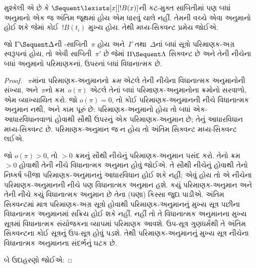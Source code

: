 મુશ્કેલી એ છે કે
$\Sequent \lexists[x][!B(x)]$ની
કટ-મુક્ત સાબિતીમાં પણ
બધાં~\RightR{\lexists}
અનુમાનો એક જ અંતિમ જૂથમાં
હોય એમ ધારવું ચાલે નહીં.
તેમની વચ્ચે એવા અનુમાનો
હોઈ શકે જેમાં કોઈ~$!B(t_i)$
મુખ્ય હોય. તેથી મધ્ય-સિક્વન્ટ
પ્રમેય જોઈએ.

\begin{thm}[મધ્ય-સિક્વન્ટ પ્રમેય]
જો $\Gamma \Sequent \Delta$ની
-સાબિતી~$\pi$ હોય
અને~$\Gamma$ તથા~$\Delta$નાં
બધાં સૂત્રો પરિમાણક-અગ્ર
સ્વરૂપનાં હોય, તો એવી
સાબિતી~$\pi'$ છે જેમાં
$\Pi \Sequent \Lambda$
સિક્વન્ટ છે અને તેની નીચેના
બધાં અનુમાનો પરિમાણકનાં,
ઉપરનાં બધાં વિધાનાત્મક છે.
\end{thm}

\begin{proof}
  ~$\pi$માંના પરિમાણક-અનુમાનનો
  \emph{ક્રમ} એટલે તેની નીચેના
  વિધાનાત્મક અનુમાનોની સંખ્યા,
  અને~$\pi$નો ક્રમ~$o(\pi)$ એટલે
  તેનાં બધાં પરિમાણક-અનુમાનોના
  ક્રમોનો સરવાળો, એમ વ્યાખ્યાયિત કરો.
  જો $o(\pi) = 0$, તો કોઈ
  પરિમાણક-અનુમાનની નીચે
  વિધાનાત્મક અનુમાન નથી,
  અને કામ પૂરું છે:
  પરિમાણક-અનુમાનો હોય તો
  બધાં એક-આધારવિધાનવાળાં હોવાથી
  સૌથી ઉપરનું એક પરિમાણક-અનુમાન
  છે; તેનું આધારવિધાન
  મધ્ય-સિક્વન્ટ છે.
  પરિમાણક-અનુમાન જ ન હોય તો
  અંતિમ સિક્વન્ટ મધ્ય-સિક્વન્ટ લઈએ.
  

  જો $o(\pi) > 0$, તો
  $>0$ ક્રમનું સૌથી નીચેનું
  પરિમાણક-અનુમાન પસંદ કરો.
  તેનો ક્રમ $>0$ હોવાથી
  તેની નીચે વિધાનાત્મક
  અનુમાન હોવું જોઈએ.
  તે સૌથી નીચેનું હોવાથી
  તેનો નિષ્કર્ષ બીજા
  પરિમાણક-અનુમાનનું આધારવિધાન
  હોઈ શકે નહીં; એવું હોય
  તો એ નીચેના પરિમાણક-અનુમાનની
  નીચે પણ વિધાનાત્મક અનુમાન
  હશે. કયું પરિમાણક-અનુમાન
  અને તેની નીચે કયું વિધાનાત્મક
  અનુમાન છે તેના (ઘણા)
  કિસ્સા જુદા પાડીએ.
  અંતિમ સિક્વન્ટમાં માત્ર
  પરિમાણક-અગ્ર સૂત્રો હોવાથી
  પરિમાણક-અનુમાનનું મુખ્ય
  સૂત્ર પછીના વિધાનાત્મક
  અનુમાનમાં સક્રિય હોઈ
  શકે નહીં. નહીં તો
  તે વિધાનાત્મક અનુમાનના
  મુખ્ય સૂત્રમાં વિધાનાત્મક
  સંયોજકના વ્યાપમાં
  પરિમાણક આવશે.
  ઉપ-સૂત્ર ગુણધર્મથી
  તે અંતિમ સિક્વન્ટના કોઈ
  સૂત્રનું
  ઉપ-સૂત્ર હોવું પડશે.
  તેથી પરિમાણક-અનુમાનનું
  મુખ્ય સૂત્ર નીચેના
  વિધાનાત્મક અનુમાનના સંદર્ભનું
  ઘટક છે.

  બે ઉદાહરણો જોઈએ:


\end{proof}
